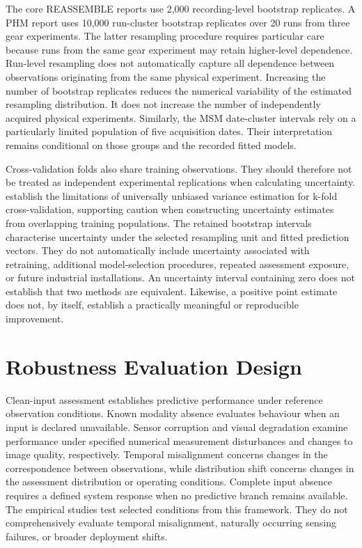 The core REASSEMBLE reports use 2,000 recording-level bootstrap replicates. A PHM report uses 10,000 run-cluster bootstrap replicates over 20 runs from three gear experiments. The latter resampling procedure requires particular care because runs from the same gear experiment may retain higher-level dependence. Run-level resampling does not automatically capture all dependence between observations originating from the same physical experiment. Increasing the number of bootstrap replicates reduces the numerical variability of the estimated resampling distribution. It does not increase the number of independently acquired physical experiments. Similarly, the MSM date-cluster intervals rely on a particularly limited population of five acquisition dates. Their interpretation remains conditional on those groups and the recorded fitted models.

Cross-validation folds also share training observations. They should therefore not be treated as independent experimental replications when calculating uncertainty. \textcite{Bengio2004CVVariance} establish the limitations of universally unbiased variance estimation for k-fold cross-validation, supporting caution when constructing uncertainty estimates from overlapping training populations. The retained bootstrap intervals characterise uncertainty under the selected resampling unit and fitted prediction vectors. They do not automatically include uncertainty associated with retraining, additional model-selection procedures, repeated assessment exposure, or future industrial installations. An uncertainty interval containing zero does not establish that two methods are equivalent. Likewise, a positive point estimate does not, by itself, establish a practically meaningful or reproducible improvement.

\section{Robustness Evaluation Design}
\label{sec:ch4-robustness}

Clean-input assessment establishes predictive performance under reference observation conditions. Known modality absence evaluates behaviour when an input is declared unavailable. Sensor corruption and visual degradation examine performance under specified numerical measurement disturbances and changes to image quality, respectively. Temporal misalignment concerns changes in the correspondence between observations, while distribution shift concerns changes in the assessment distribution or operating conditions. Complete input absence requires a defined system response when no predictive branch remains available. The empirical studies test selected conditions from this framework. They do not comprehensively evaluate temporal misalignment, naturally occurring sensing failures, or broader deployment shifts.

